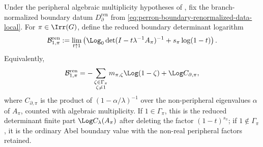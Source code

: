 \begin{proposition}
  \label{prop:renormalized-fixed-label-determinant-component}
  Under the peripheral algebraic multiplicity hypotheses of
  ,
  fix the branch-normalized boundary datum
  \(D_{\partial}^{\mathrm{ren}}\) from
  \eqref{eq:perron-boundary-renormalized-data-local}.  For
  \(\pi\in\Irr(G)\), define the reduced boundary determinant logarithm
  \begin{equation}\label{eq:renormalized-reduced-boundary-log}
    \mathcal B_{1,\pi}^{\mathrm{ren}}
    :=
    \lim_{t\uparrow1}
      \left(
        \Log_0\det(I-t\lambda^{-1}A_\pi)^{-1}
        +s_\pi\log(1-t)
      \right).
  \end{equation}
  Equivalently,
  \[
    \mathcal B_{1,\pi}^{\mathrm{ren}}
    =
    -\sum_{\substack{\zeta\in\Gamma_\pi\\\zeta\ne1}}
      m_{\pi,\zeta}\Log(1-\zeta)
    +
    \Log C_{\partial,\pi},
  \]
  where \(C_{\partial,\pi}\) is the product of
  \((1-\alpha/\lambda)^{-1}\) over the non-peripheral eigenvalues
  \(\alpha\) of \(A_\pi\), counted with algebraic multiplicity.  If
  \(1\in\Gamma_\pi\), this is the reduced determinant finite part
  \(\Log C_\lambda(A_\pi)\) after deleting the factor
  \((1-t)^{s_\pi}\); if \(1\notin\Gamma_\pi\), it is the ordinary Abel
  boundary value with the non-real peripheral factors retained.


\end{proposition}
